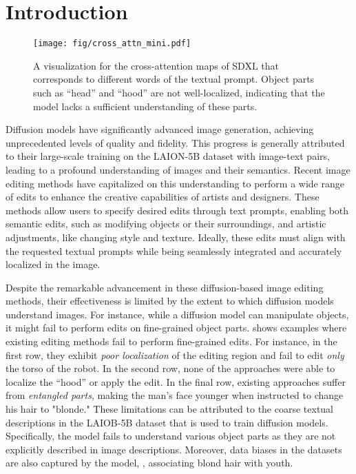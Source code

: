 

\section{Introduction}
\label{sec:intro}

\begin{figure*}[t]
    \centering
    \texttt{[image: fig/cross\_attn\_mini.pdf]}
    \caption{A visualization for the cross-attention maps of SDXL \citep{podell2024sdxl} that corresponds to different words of the textual prompt. Object parts such as ``head'' and ``hood'' are not well-localized, indicating that the model lacks a sufficient understanding of these parts. 
    }
    \label{fig:cattn}
\end{figure*}


Diffusion models \citep{sd,dalle2,imagen,podell2024sdxl,esser2024scaling} have significantly advanced image generation, achieving unprecedented levels of quality and fidelity.
This progress is generally attributed to their large-scale training on the LAION-5B dataset \citep{laion5b} with image-text pairs, leading to a profound understanding of images and their semantics. 
Recent image editing methods \citep{hertz2022prompt,brooks2023instructpix2pix,brack2024ledits,parmar2023zero,pnp,kawar2023imagic,huang2024diffusion} have capitalized on this understanding to perform a wide range of edits to enhance the creative capabilities of artists and designers.
These methods allow users to specify desired edits through text prompts, enabling both semantic edits, such as modifying objects or their surroundings, and artistic adjustments, like changing style and texture. 
Ideally, these edits must align with the requested textual prompts while being seamlessly integrated and accurately localized in the image. 

Despite the remarkable advancement in these diffusion-based image editing methods, their effectiveness is limited by the extent to which diffusion models understand images.
For instance, while a diffusion model can manipulate objects, it might fail to perform edits on fine-grained object parts.
 shows examples where existing editing methods fail to perform fine-grained edits.
For instance, in the first row, they exhibit \emph{poor localization} of the editing region and fail to edit \emph{only} the torso of the robot.
In the second row, none of the approaches were able to localize the ``hood'' or apply the edit.
In the final row, existing approaches suffer from \emph{entangled parts}, making the man's face younger when instructed to change his hair to "blonde."
These limitations can be attributed to the coarse textual descriptions in the LAIOB-5B dataset that is used to train diffusion models. 
Specifically, the model fails to understand various object parts as they are not explicitly described in image descriptions.
Moreover, data biases in the datasets are also captured by the model, \eg, associating blond hair with youth.

